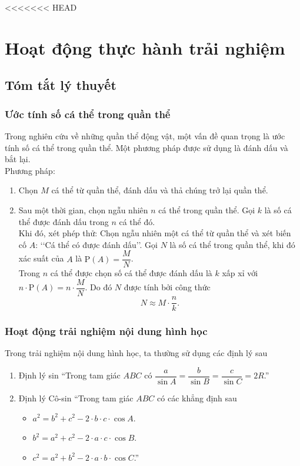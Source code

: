 <<<<<<< HEAD
\section{Hoạt động thực hành trải nghiệm}
\subsection{Tóm tắt lý thuyết}
\subsubsection{Ước tính số cá thể trong quần thể}
Trong nghiên cứu về những quần thể động vật, một vấn đề quan trọng là ước tính số cá thể trong quần thể. Một phương pháp được sử dụng là đánh dấu và bắt lại.\\
Phương pháp: 
\begin{enumerate}
	\item Chọn $M$ cá thể từ quần thể, đánh dấu và thả chúng trở lại quần thể.
	\item Sau một thời gian, chọn ngẫu nhiên $n$ cá thể trong quần thể. Gọi $k$ là số cá thể được đánh dấu trong $n$ cá thể đó.\\
	Khi đó, xét phép thử: Chọn ngẫu nhiên một cá thể từ quần thể và xét biến cố $A$: \lq\lq  Cá thể có được đánh dấu\rq\rq. Gọi $N$ là số cá thể trong quần thể, khi đó xác suất của $A$ là $\mathrm{P}(A)=\dfrac{M}{N}$.\\
	Trong $n$ cá thể được chọn số cá thể được đánh dấu là $k$ xấp xỉ với $n\cdot \mathrm{P}(A)=n\cdot \dfrac{M}{N}$. Do đó $N$ được tính bởi công thức 
	\[N\approx M\cdot \dfrac{n}{k}.\]
\end{enumerate}
\subsubsection{Hoạt động trải nghiệm nội dung hình học}
Trong trải nghiệm nội dung hình học, ta thường sử dụng các định lý sau
\begin{enumerate}
\item Định lý sin ``Trong tam giác $ABC$ có $\dfrac{a}{\sin A}=\dfrac{b}{\sin B}=\dfrac{c}{\sin C}=2R$.''
\item Định lý Cô-sin ``Trong tam giác $ABC$ có các khẳng định sau
\begin{itemize}
\item $a^{2}=b^{2}+c^{2}-2 \cdot b \cdot c \cdot \cos A$.
\item $b^{2}=a^{2}+c^{2}-2 \cdot a \cdot c \cdot \cos B$.
\item $c^{2}=a^{2}+b^{2}-2 \cdot a \cdot b \cdot \cos C$.''
\end{itemize}
\end{enumerate}

